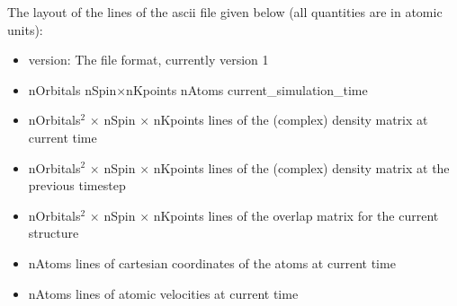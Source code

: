 The layout of the lines of the ascii file given below (all quantities are in
atomic units):

\begin{itemize}
\item version: The file format, currently version 1
\item nOrbitals nSpin$\times$nKpoints nAtoms current\_simulation\_time
\item nOrbitals$^2$ $\times$ nSpin $\times$ nKpoints lines of the (complex)
  density matrix at current time
\item nOrbitals$^2$ $\times$ nSpin $\times$ nKpoints lines of the (complex)
  density matrix at the previous timestep
\item nOrbitals$^2$ $\times$ nSpin $\times$ nKpoints lines of the overlap matrix
  for the current structure
\item nAtoms lines of cartesian coordinates of the atoms at current time
\item nAtoms lines of atomic velocities at current time
\end{itemize}
